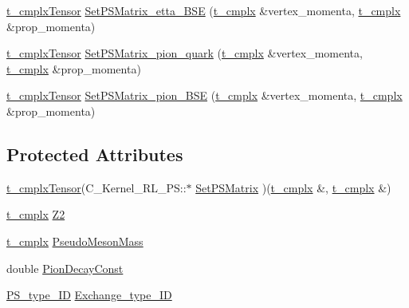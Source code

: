 \begin{DoxyCompactItemize}
\item 
\hyperlink{types_8h_a23430de2ae483000af45037b36fedba8}{t\-\_\-cmplx\-Tensor} \hyperlink{class_c___kernel___r_l___p_s_a727f610ca37be4a8c379f0a32ca43301}{Set\-P\-S\-Matrix\-\_\-etta\-\_\-\-B\-S\-E} (\hyperlink{types_8h_aa75ae339052372f671bb263e6a272e82}{t\-\_\-cmplx} \&vertex\-\_\-momenta, \hyperlink{types_8h_aa75ae339052372f671bb263e6a272e82}{t\-\_\-cmplx} \&prop\-\_\-momenta)
\item 
\hyperlink{types_8h_a23430de2ae483000af45037b36fedba8}{t\-\_\-cmplx\-Tensor} \hyperlink{class_c___kernel___r_l___p_s_aa9e8de0d2615d212c08522fb004d9e9a}{Set\-P\-S\-Matrix\-\_\-pion\-\_\-quark} (\hyperlink{types_8h_aa75ae339052372f671bb263e6a272e82}{t\-\_\-cmplx} \&vertex\-\_\-momenta, \hyperlink{types_8h_aa75ae339052372f671bb263e6a272e82}{t\-\_\-cmplx} \&prop\-\_\-momenta)
\item 
\hyperlink{types_8h_a23430de2ae483000af45037b36fedba8}{t\-\_\-cmplx\-Tensor} \hyperlink{class_c___kernel___r_l___p_s_afe3f06a61a5fa9cd043e4c4319fec8b0}{Set\-P\-S\-Matrix\-\_\-pion\-\_\-\-B\-S\-E} (\hyperlink{types_8h_aa75ae339052372f671bb263e6a272e82}{t\-\_\-cmplx} \&vertex\-\_\-momenta, \hyperlink{types_8h_aa75ae339052372f671bb263e6a272e82}{t\-\_\-cmplx} \&prop\-\_\-momenta)
\end{DoxyCompactItemize}
\subsection*{Protected Attributes}
\begin{DoxyCompactItemize}
\item 
\hyperlink{types_8h_a23430de2ae483000af45037b36fedba8}{t\-\_\-cmplx\-Tensor}(C\-\_\-\-Kernel\-\_\-\-R\-L\-\_\-\-P\-S\-::$\ast$ \hyperlink{class_c___kernel___r_l___p_s_adf4728ca0caa741eb5242e4c8b67ef44}{Set\-P\-S\-Matrix} )(\hyperlink{types_8h_aa75ae339052372f671bb263e6a272e82}{t\-\_\-cmplx} \&, \hyperlink{types_8h_aa75ae339052372f671bb263e6a272e82}{t\-\_\-cmplx} \&)
\item 
\hyperlink{types_8h_aa75ae339052372f671bb263e6a272e82}{t\-\_\-cmplx} \hyperlink{class_c___kernel___r_l___p_s_a737ca2c158cc24d99d183314cd4ef248}{Z2}
\item 
\hyperlink{types_8h_aa75ae339052372f671bb263e6a272e82}{t\-\_\-cmplx} \hyperlink{class_c___kernel___r_l___p_s_afa5aab2c72c55dd84fd3dd0f4a6e374b}{Pseudo\-Meson\-Mass}
\item 
double \hyperlink{class_c___kernel___r_l___p_s_aa82b36af4649caa720d579b2d6bcb6f3}{Pion\-Decay\-Const}
\item 
\hyperlink{_abstract_kernel_8hpp_a7d489d4c6a933f94b90a630d2851e68d}{P\-S\-\_\-type\-\_\-\-I\-D} \hyperlink{class_c___kernel___r_l___p_s_ad5e946bcffd8182012bf848dd2dca8a7}{Exchange\-\_\-type\-\_\-\-I\-D}
\end{DoxyCompactItemize}
